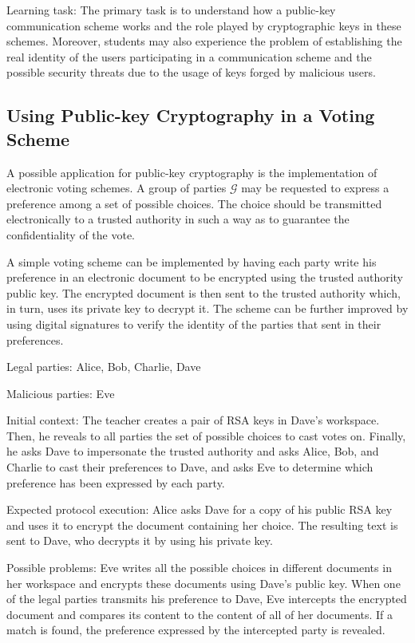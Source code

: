 \documentclass[10pt,conference]{IEEEtran}
\begin{document}
{\sc Learning task:} The primary task is to understand how
a public-key communication scheme works and the role played by
cryptographic keys in these schemes. Moreover, students may also
experience the problem of establishing the real identity
of the users participating in a communication scheme and the possible
security threats due to the usage of keys forged by malicious users. 


\subsection{ Using Public-key Cryptography in a Voting Scheme}

A possible application for public-key cryptography is the
implementation of electronic voting schemes. A group of
parties ${\mathcal G}$ may be requested to express
a preference among a set of possible choices. The choice
should be transmitted electronically to a trusted authority
in such a way as to guarantee the confidentiality of the vote. 


A simple voting scheme can be implemented by having each party
write his preference in an electronic document to be encrypted
using the trusted authority public key. The encrypted document
is then sent to the trusted authority which, in turn, uses
its private key to decrypt it. The scheme can be further
improved by using digital signatures to verify the identity of the parties that sent in their preferences. 

{\sc Legal parties:} Alice, Bob, Charlie, Dave

{\sc Malicious parties:} Eve

{\sc Initial context:} The teacher creates a pair of RSA keys
in Dave's workspace. Then, he reveals to all parties the set of
possible choices to cast votes on. Finally, he asks Dave to
impersonate the trusted authority and asks Alice, Bob,
and Charlie to cast their preferences to Dave, and asks Eve to determine which preference has been expressed by each party.

{\sc Expected protocol execution:} Alice asks Dave for
a copy of his public RSA key and uses it to encrypt the
document containing her choice. The resulting text is sent to Dave, who decrypts it by using his private key.

{\sc Possible problems:} Eve writes all the possible choices in
different documents in her workspace and encrypts these documents
using Dave's public key. When one of the legal parties transmits
his preference to Dave, Eve intercepts the encrypted document
and compares its content to the content of all of her documents.
If a match is found, the preference expressed by the intercepted party is revealed.
\end{document}
